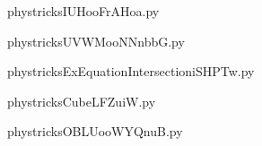     

    \clearpage
    


    \newcommand{\CaptionFigIUHooFrAHoa}{<+Type your caption here+>}
    \begin{center}
        
    \end{center}
    phystricksIUHooFrAHoa.py

    

    \clearpage
    


    \newcommand{\CaptionFigUVWMooNNnbbG}{<+Type your caption here+>}
    \begin{center}
        
    \end{center}
    phystricksUVWMooNNnbbG.py

    

    \clearpage
    


    \newcommand{\CaptionFigExEquationIntersectioniSHPTw}{<+Type your caption here+>}
    \begin{center}
        
    \end{center}
    phystricksExEquationIntersectioniSHPTw.py

    

    \clearpage
    


    \newcommand{\CaptionFigCubeLFZuiW}{<+Type your caption here+>}
    \begin{center}
        
    \end{center}
    phystricksCubeLFZuiW.py

    

    \clearpage
    


    \newcommand{\CaptionFigOBLUooWYQnuB}{<+Type your caption here+>}
    \begin{center}
        
    \end{center}
    phystricksOBLUooWYQnuB.py

    

    \clearpage
    

